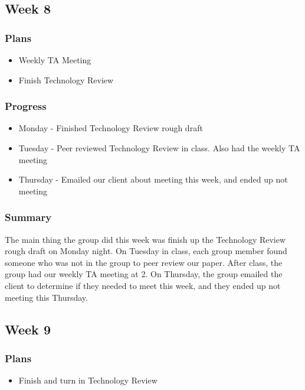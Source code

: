 \documentclass[onecolumn, draftclsnofoot,10pt, compsoc]{IEEEtran}
\begin{document}
\subsection{Week 8}

\subsubsection{Plans}
\begin{itemize}
\item Weekly TA Meeting
\item Finish Technology Review

\end{itemize}

\subsubsection{Progress}
\begin{itemize}
\item Monday - Finished Technology Review rough draft
\item Tuesday - Peer reviewed Technology Review in class. Also had the weekly TA meeting
\item Thursday - Emailed our client about meeting this week, and ended up not meeting

\end{itemize}
\subsubsection{Summary}
The main thing the group did this week was finish up the Technology Review rough draft on Monday night. On Tuesday in class, each group member found someone who was not in the group to peer review our paper. After class, the group had our weekly TA meeting at 2. On Thursday, the group emailed the client to determine if they needed to meet this week, and they ended up not meeting this Thursday.
\subsection{Week 9}

\subsubsection{Plans}
\begin{itemize}
\item Finish and turn in Technology Review
\end{itemize}
\end{document}
